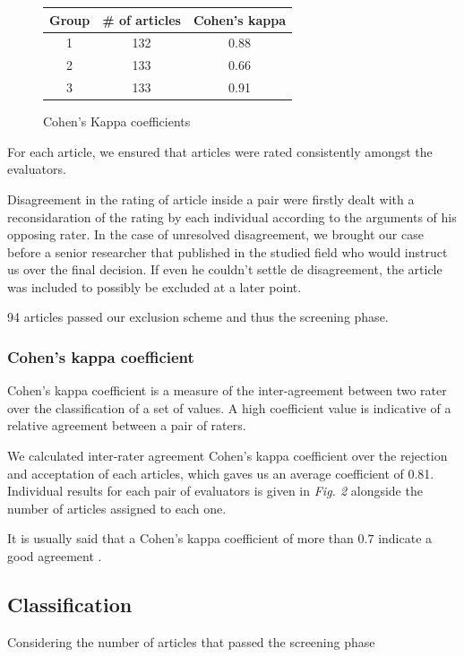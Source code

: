 \documentclass[letterpaper, 10 pt, conference]{ieeeconf}  %
\begin{document}
\begin{figure}
 \centering
  \begin{tabular}{ ccc }
   \bf Group & \bf \# of articles & \bf Cohen's kappa \\
   \hline {}
   1 & 132 & 0.88 \\
   2 & 133 & 0.66 \\
   3 & 133 & 0.91 \\
 \end{tabular}
 \caption{Cohen's Kappa coefficients}
\end{figure}

For each article, we ensured that articles were rated consistently amongst the
evaluators.

Disagreement in the rating of article inside a pair were firstly dealt with a
reconsidaration of the rating by each individual according to the arguments of
his opposing rater.
In the case of unresolved disagreement, we brought our case before a senior
researcher that published in the studied field who would instruct us over the final
decision.
If even he couldn't settle de disagreement, the article was included to possibly be
excluded at a later point.

94 articles passed our exclusion scheme and thus the screening phase. 



\subsubsection{Cohen's kappa coefficient}
Cohen's kappa coefficient is a measure of the inter-agreement between two rater
over the classification of a set of values.
A high coefficient value is indicative of a relative agreement between a pair
of raters.

We calculated inter-rater agreement Cohen's kappa coefficient over the
rejection and acceptation of each articles, which gaves us an average
coefficient of 0.81.
Individual results for each pair of evaluators is given in \textit{Fig. 2}
alongside the number of articles assigned to each one.

It is usually said that a Cohen's kappa coefficient of more than $0.7$ indicate
a good agreement \cite{c3}.


\subsection{Classification}

Considering the number of articles that passed the screening phase
\end{document}
